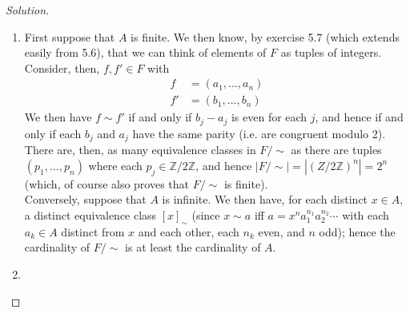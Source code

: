 \documentclass[12pt]{article}
\newenvironment{solution}
  {\renewcommand\qedsymbol{$\blacksquare$}\begin{proof}[Solution]}
{\end{proof}}
\begin{document}
\begin{solution}
  \begin{enumerate}
    \item First suppose that $A$ is finite.
      We then know, by exercise 5.7 (which extends easily from 5.6), that we can think of elements of $F$ 
      as tuples of integers.
      Consider, then, $f, f'\in F$ with\\
      \begin{align*}
        f &= (a_1, \dots, a_n)\\
        f'&= (b_1,\dots, b_n)
      \end{align*}
      We then have $f\sim f'$ if and only if $b_j - a_j$ is even for each $j$, and hence if and only if
      each $b_j$ and $a_j$ have the same parity (i.e. are congruent modulo 2).
      There are, then, as many equivalence classes in $F/{\sim}$ as there are tuples 
      $(p_1, \dots, p_n)$ where each $p_j \in \mathbb{Z}/2\mathbb{Z}$, and hence 
      $|F/{\sim}| = |(Z/2\mathbb{Z})^n| = 2^n$ (which, of course also proves that $F/{\sim}$ is finite).\\
      Conversely, suppose that $A$ is infinite.
      We then have, for each distinct $x\in A$, a distinct equivalence class $[x]_{\sim}$
      (since $x\sim a$ iff $a = x^{n} a_1^{n_1} a_2^{n_2} \cdots$ with each $a_k\in A$ distinct from $x$
        and each other,
      each $n_k$ even, and $n$ odd); hence the cardinality of $F/{\sim}$ is at least the cardinality of $A$.
    \item 
  \end{enumerate}
\end{solution}
\end{document}
